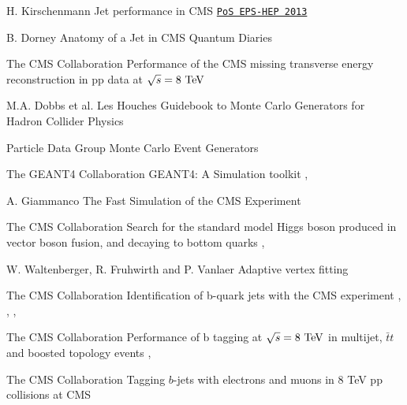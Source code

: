 {H. Kirschenmann}
{Jet performance in CMS}
{\texttt{\href{http://pos.sissa.it/archive/conferences/180/433/EPS-HEP\%202013_433.pdf}{PoS EPS-HEP 2013}}}

{B. Dorney}
{Anatomy of a Jet in CMS}
{Quantum Diaries}

{The CMS Collaboration}
{Performance of the CMS missing transverse energy reconstruction in pp data at $\sqrt{s} = 8~\text{TeV}$}
{ }

{M.A. Dobbs et al.}
{Les Houches Guidebook to Monte Carlo Generators for Hadron Collider Physics}
{}

{Particle Data Group}
{Monte Carlo Event Generators}
{}

{The GEANT4 Collaboration}
{GEANT4: A Simulation toolkit}
{, }

{A. Giammanco}
{The Fast Simulation of the CMS Experiment}
{}


{The CMS Collaboration}
{Search for the standard model Higgs boson produced in
vector boson fusion, and decaying to bottom quarks}
{, }

{W. Waltenberger, R. Fruhwirth and P. Vanlaer}
{Adaptive vertex fitting}
{}

{The CMS Collaboration}
{Identification of b-quark jets with the CMS experiment}
{, , , }

{The CMS Collaboration}
{Performance of b tagging at $\sqrt{s} = 8~\text{TeV}$ in multijet, $\bar{t}t$ and boosted topology events}
{, }

{The CMS Collaboration}
{Tagging $b$-jets with electrons and muons in 8 TeV pp collisions at CMS}
{}

